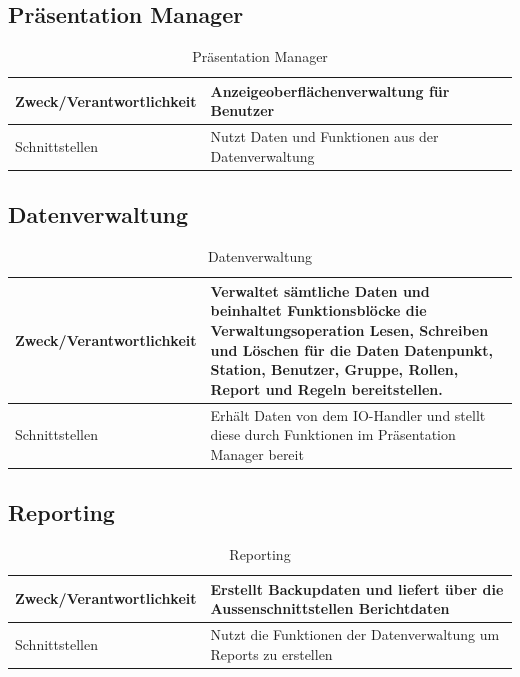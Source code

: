 \subsection{Präsentation Manager}
\begin{table}[th]
	\begin{tabularx}{\textwidth}{p{5cm} X}
		\hline
		Zweck/Verantwortlichkeit & Anzeigeoberflächenverwaltung für Benutzer \\
		\hline
		Schnittstellen & Nutzt Daten und Funktionen aus der Datenverwaltung\\
		\hline
	\end{tabularx} 
	\caption{Präsentation Manager}
	\label{tab:Präsentation Manager}
\end{table}

\subsection{Datenverwaltung}
\begin{table}[th]
	\begin{tabularx}{\textwidth}{p{5cm} X}
		\hline
		Zweck/Verantwortlichkeit & Verwaltet sämtliche Daten und beinhaltet Funktionsblöcke die Verwaltungsoperation Lesen, Schreiben und Löschen für die Daten Datenpunkt, Station, Benutzer, Gruppe, Rollen, Report und Regeln bereitstellen. \\
		\hline
		Schnittstellen & Erhält Daten von dem IO-Handler und stellt diese durch Funktionen im Präsentation Manager bereit\\
		\hline
	\end{tabularx} 
	\caption{Datenverwaltung}
	\label{Datenverwaltung}
\end{table}
\clearpage
\subsection{Reporting}
\begin{table}[th]
	\begin{tabularx}{\textwidth}{p{5cm} X}
		\hline
		Zweck/Verantwortlichkeit & Erstellt Backupdaten und liefert über die Aussenschnittstellen Berichtdaten \\
		\hline
		Schnittstellen & Nutzt die Funktionen der Datenverwaltung um Reports zu erstellen\\
		\hline
	\end{tabularx} 
	\caption{Reporting}
	\label{tab:Reporting}
\end{table}

